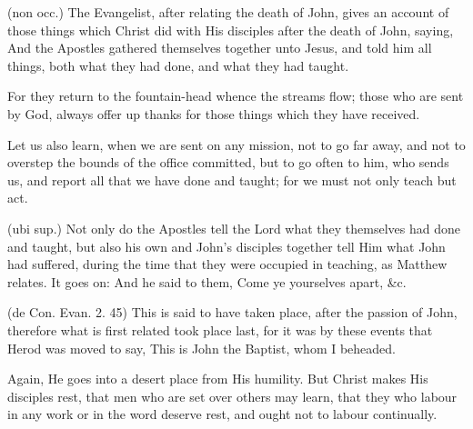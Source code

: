 

 (non occ.) The Evangelist, after relating the death of John, gives an account of those things which Christ did with His disciples after the death of John, saying, And the Apostles gathered themselves together unto Jesus, and told him all things, both what they had done, and what they had taught.

 For they return to the fountain-head whence the streams flow; those who are sent by God, always offer up thanks for those things which they have received.

 Let us also learn, when we are sent on any mission, not to go far away, and not to overstep the bounds of the office committed, but to go often to him, who sends us, and report all that we have done and taught; for we must not only teach but act.

 (ubi sup.) Not only do the Apostles tell the Lord what they themselves had done and taught, but also his own and John’s disciples together tell Him what John had suffered, during the time that they were occupied in teaching, as Matthew relates. It goes on: And he said to them, Come ye yourselves apart, \&c.

 (de Con. Evan. 2. 45) This is said to have taken place, after the passion of John, therefore what is first related took place last, for it was by these events that Herod was moved to say, This is John the Baptist, whom I beheaded.

 Again, He goes into a desert place from His humility. But Christ makes His disciples rest, that men who are set over others may learn, that they who labour in any work or in the word deserve rest, and ought not to labour continually.

